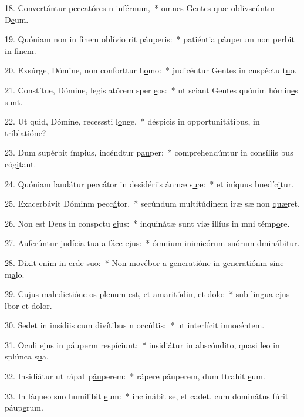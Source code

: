 18. Convertántur peccatóres n inf\uline{é}rnum,~* omnes Gentes quæ oblivscúntur D\uline{e}um.\par 
19. Quóniam non in finem oblívio rit p\uline{áu}peris:~* patiéntia páuperum non perbit in f\uline{i}nem.\par 
20. Exsúrge, Dómine, non conforttur h\uline{o}mo:~* judicéntur Gentes in cnspéctu t\uline{u}o.\par 
21. Constítue, Dómine, legislatórem sper \uline{e}os:~* ut sciant Gentes quónim hómin\uline{e}s sunt.\par 
22. Ut quid, Dómine, recesssti l\uline{o}nge,~* déspicis in opportunitátibus, in triblati\uline{ó}ne?\par 
23. Dum supérbit ímpius, incéndtur p\uline{au}per:~* comprehendúntur in consíliis bus cóg\uline{i}tant.\par 
24. Quóniam laudátur peccátor in desidériis ánmæ s\uline{u}æ:~* et iníquus bnedíc\uline{i}tur.\par 
25. Exacerbávit Dóminm pecc\uline{á}tor,~* secúndum multitúdinem iræ sæ non \uline{quæ}ret.\par 
26. Non est Deus in conspctu \uline{e}jus:~* inquinátæ sunt viæ illíus in mni témp\uline{o}re.\par 
27. Auferúntur judícia tua a fáce \uline{e}jus:~* ómnium inimicórum suórum dmináb\uline{i}tur.\par 
28. Dixit enim in crde s\uline{u}o:~* Non movébor a generatióne in generatiónm sine m\uline{a}lo.\par 
29. Cujus maledictióne os plenum est, et amaritúdin, et d\uline{o}lo:~* sub lingua ejus lbor et d\uline{o}lor.\par 
30. Sedet in insídiis cum divítibus n occ\uline{ú}ltis:~* ut interfícit innoc\uline{é}ntem.\par 
31. Oculi ejus in páuperm resp\uline{í}ciunt:~* insidiátur in abscóndito, quasi leo in splúnca s\uline{u}a.\par 
32. Insidiátur ut rápat p\uline{áu}perem:~* rápere páuperem, dum ttrahit \uline{e}um.\par 
33. In láqueo suo humilibit \uline{e}um:~* inclinábit se, et cadet, cum dominátus fúrit páup\uline{e}rum.\par 
